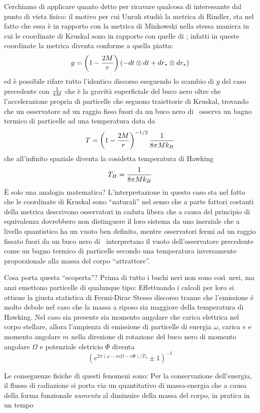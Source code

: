 Cerchiamo di applicare quanto detto per ricavare qualcosa di interessante dal punto di vista fisico: il motivo per cui Unruh studi\`o la metrica di Rindler, sta nel fatto che essa  \`e in rapporto con la metrica di Minkowski nella stessa maniera in cui le coordinate di Kruskal sono in rapporto con quelle di \Sch; infatti in queste coordinate la metrica diventa conforme a quella piatta:
$$
g=\left(1-{2M\over r}\right)\left(-dt\otimes dt+dr_\ast\otimes dr_\ast\right)
$$
ed \`e possibile rifare tutto l'identico discorso eseguendo lo scambio di $g$ del caso precedente con ${1\over 4M}$ che \`e la gravit\`a superficiale del buco nero oltre che l'accelerazione propria di particelle che seguono traiettorie di Kruskal, trovando che un osservatore ad un raggio fisso fuori da un buco nero di \Sch\ osserva un bagno termico di particelle ad una temperatura data da 
$$
T=\left(1-{2M\over r}\right)^{-1/2}{1\over8\pi Mk_B}
$$
che all'infinito spaziale diventa la cosidetta temperatura di Hawking
$$
T_H={1\over8\pi Mk_B}
$$
\`E solo una analogia matematica? L'interpretazione in questo caso sta nel fatto che le coordinate di Kruskal sono ``naturali'' nel senso che a parte fattori costanti della metrica descrivono osservatori in caduta libera che a causa del principio di equivalenza dovrebbero non distinguere il loro sistema da uno inerziale che a  livello quantistico ha un vuoto ben definito, mentre osservatori fermi ad un raggio fissato fuori da un buco nero di \Sch\ interpretano il vuoto dell'osservatore precedente come un bagno termico di particelle secondo una temperatura inversamente proporzionale alla massa del corpo ``attrattore''.\par
Cosa porta  questa ``scoperta''? Prima di tutto i buchi neri non sono cos\'\i\ neri, ma anzi emettono particelle di qualunque tipo: 
 Effettuando i calcoli per loro si ottiene la giusta statistica di Fermi-Dirac
 Stesso discorso tranne che l'emissione \' e molto debole nel caso che la massa a riposo sia maggiore della temperatura di Hawking.
 Nel caso sia presente sia momento angolare che carica elettrica nel corpo stellare, allora l'ampiezza di emissione di particelle di energia $\omega$, carica $e$ e momento angolare $m$ nella direzione di rotazione del buco nero di momento angolare $\Omega$ e potenziale eletricio $\Phi$ diventa
$$
\left(e^{2\pi(\omega-m\Omega-e\Phi)/T_h}\pm1\right)^{-1}
$$
\par
Le conseguenze fisiche di questi fenomeni sono:
 Per la conservazione dell'energia, il flusso di radiazione si porta via un quantitativo di massa-energia che a causa della forma funzionale {\sl aumenta} al diminuire della massa del corpo, in pratica in un tempo
